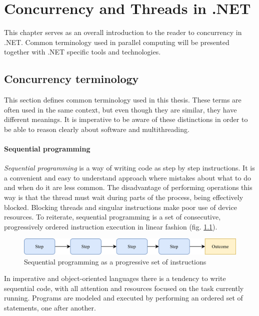 \chapter{Concurrency and Threads in .NET}
This chapter serves as an overall introduction to the reader to concurrency in .NET. Common terminology used in parallel computing will be presented together with .NET specific tools and technologies. 

\section{Concurrency terminology}
This section defines common terminology used in this thesis. These terms are often used in the same context, but even though they are similar, they have different meanings. It is imperative to be aware of these distinctions in order to be able to reason clearly about software and multithreading.

\subsubsection{Sequential programming}
\emph{Sequential programming} is a way of writing code as step by step instructions. It is a convenient and easy to understand approach where mistakes about what to do and when do it are less common.
The disadvantage of performing operations this way is that the thread must wait during parts of the process, being effectively blocked. Blocking threads and singular instructions make poor use of device resources.
To reiterate, sequential programming is a set of consecutive, progressively ordered instruction execution in linear fashion (fig. \ref{fig:seq}).

\begin{figure}[htb]
	\centering
		\includegraphics[scale=1.0]{figures02/seq.png}
	\caption{Sequential programming as a progressive set of instructions}
	\label{fig:seq}
\end{figure}

In imperative and object-oriented languages there is a tendency to write sequential code, with all attention and resources focused on the task currently running. Programs are modeled and executed by performing an ordered set of statements, one after another. \cite{terrell_2018}

